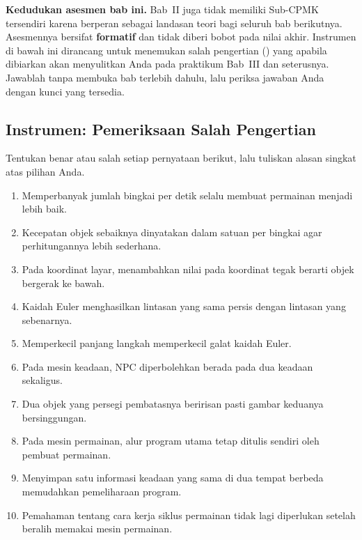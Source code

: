 
\begin{asesmenbox}
\textbf{Kedudukan asesmen bab ini.} Bab~II juga tidak memiliki Sub-CPMK
tersendiri karena berperan sebagai landasan teori bagi seluruh bab berikutnya.
Asesmennya bersifat \textbf{formatif} dan tidak diberi bobot pada nilai akhir.
Instrumen di bawah ini dirancang untuk menemukan salah pengertian
() yang apabila dibiarkan akan menyulitkan Anda pada
praktikum Bab~III dan seterusnya. Jawablah tanpa membuka bab terlebih dahulu,
lalu periksa jawaban Anda dengan kunci yang tersedia.
\end{asesmenbox}

\subsection*{Instrumen: Pemeriksaan Salah Pengertian}

Tentukan benar atau salah setiap pernyataan berikut, lalu tuliskan alasan
singkat atas pilihan Anda.

\begin{enumerate}
  \item Memperbanyak jumlah bingkai per detik selalu membuat permainan menjadi
        lebih baik.
  \item Kecepatan objek sebaiknya dinyatakan dalam satuan per bingkai agar
        perhitungannya lebih sederhana.
  \item Pada koordinat layar, menambahkan nilai pada koordinat tegak berarti
        objek bergerak ke bawah.
  \item Kaidah Euler menghasilkan lintasan yang sama persis dengan lintasan
        yang sebenarnya.
  \item Memperkecil panjang langkah memperkecil galat kaidah Euler.
  \item Pada mesin keadaan, NPC diperbolehkan berada pada dua keadaan
        sekaligus.
  \item Dua objek yang persegi pembatasnya beririsan pasti gambar keduanya
        bersinggungan.
  \item Pada mesin permainan, alur program utama tetap ditulis sendiri oleh
        pembuat permainan.
  \item Menyimpan satu informasi keadaan yang sama di dua tempat berbeda
        memudahkan pemeliharaan program.
  \item Pemahaman tentang cara kerja siklus permainan tidak lagi diperlukan
        setelah beralih memakai mesin permainan.
\end{enumerate}

